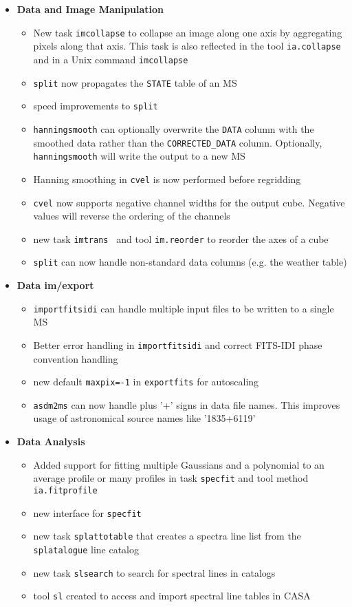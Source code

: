 \begin{itemize}
\item {\bf  Data and Image Manipulation }
   \begin{itemize}
   \item New task {\tt imcollapse} to collapse an image along one axis by aggregating pixels along that axis. This task is also reflected in the tool {\tt ia.collapse} and in a Unix command {\tt imcollapse}
   \item {\tt split} now propagates the {\tt STATE} table of an MS
   \item speed improvements to {\tt split}
   \item {\tt hanningsmooth} can optionally overwrite the {\tt DATA} column with the smoothed data rather than the {\tt CORRECTED\_DATA} column. Optionally, {\tt hanningsmooth} will write the output to a new MS 
   \item Hanning smoothing in {\tt cvel} is now performed before regridding
   \item {\tt cvel} now supports negative channel widths for the output cube. Negative values will reverse the ordering of the channels
   \item new task {\tt  imtrans } and tool {\tt  im.reorder} to reorder
  the axes of a cube
   \item {\tt split} can now handle non-standard data columns (e.g. the weather table) 
   \end{itemize}

\item {\bf  Data im/export }
     \begin{itemize}
      \item{\tt importfitsidi} can handle multiple input files to be written to a single MS 
     \item Better error handling in {\tt importfitsidi} and correct FITS-IDI phase convention handling
      \item new default {\tt maxpix=-1} in {\tt exportfits} for autoscaling
      \item {\tt asdm2ms} can now handle plus '+' signs in data file names. This improves usage of astronomical source names like '1835+6119'
  
      \end{itemize}

\item {\bf  Data Analysis }
    \begin{itemize}
    \item Added support for fitting multiple Gaussians and a polynomial to an average profile or many profiles in task {\tt specfit} and tool method {\tt ia.fitprofile}
    \item new interface for {\tt specfit}
    \item new task {\tt splattotable} that creates a spectra line list from the {\tt splatalogue} line catalog
    \item new task {\tt slsearch} to search for spectral lines in catalogs
    \item tool {\tt sl} created to access and import spectral line tables in CASA


\end{itemize}
\end{itemize}
